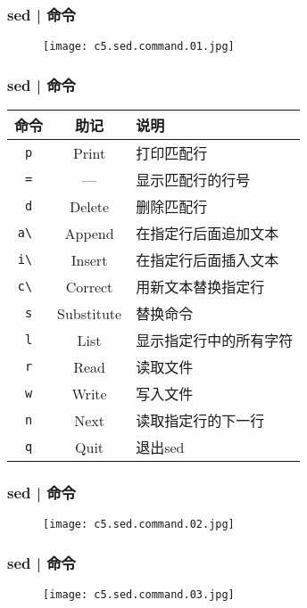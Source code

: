 \begin{frame}
  \frametitle{sed | 命令}
  \begin{figure}
    \centering
    \texttt{[image: c5.sed.command.01.jpg]}
  \end{figure}
\end{frame}

\begin{frame}[fragile]
  \frametitle{sed | \alert{命令}}
  \begin{table}
    \centering
    \begin{tabularx}{0.8\textwidth}{ccX}
      \hline
      \rowcolor{blue!50}命令 & 助记 & 说明\\
      \hline
      \verb|p| & Print & 打印匹配行\\
      \verb|=| & --- & 显示匹配行的行号\\
      \verb|d| & Delete & 删除匹配行\\
      \verb|a\ | & Append &  在指定行后面追加文本\\
      \verb|i\ | & Insert & 在指定行后面插入文本\\
      \verb|c\ | & Correct & 用新文本替换指定行\\
      \verb|s| & Substitute & 替换命令\\
      \verb|l| & List & 显示指定行中的所有字符\\
      \verb|r| & Read & 读取文件\\
      \verb|w| & Write & 写入文件\\
      \verb|n| & Next & 读取指定行的下一行\\
      \verb|q| & Quit & 退出sed\\
      \hline
    \end{tabularx}
  \end{table}
\end{frame}

\begin{frame}
  \frametitle{sed | 命令}
  \begin{figure}
    \centering
    \texttt{[image: c5.sed.command.02.jpg]}
  \end{figure}
\end{frame}

\begin{frame}
  \frametitle{sed | 命令}
  \begin{figure}
    \centering
    \texttt{[image: c5.sed.command.03.jpg]}
  \end{figure}
\end{frame}

